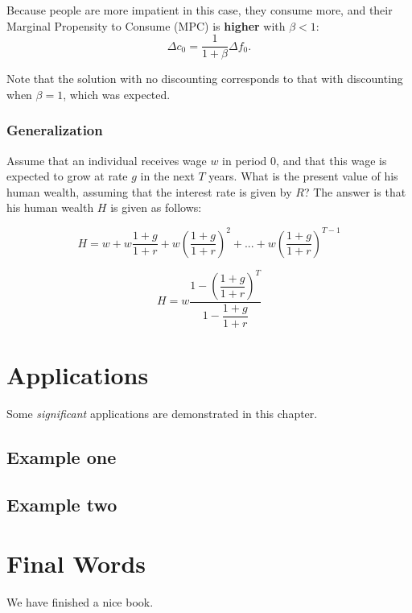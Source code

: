 \documentclass[]{book}
\theoremstyle{definition}
\theoremstyle{definition}
\theoremstyle{definition}
\theoremstyle{remark}
\begin{document}
Because people are more impatient in this case, they consume more, and
their Marginal Propensity to Consume (MPC) is \textbf{higher} with
\(\beta<1\): \[\Delta c_0 = \frac{1}{1+\beta}\Delta f_0.\]

Note that the solution with no discounting corresponds to that with
discounting when \(\beta=1\), which was expected.

\subsection{Generalization}\label{generalization}

Assume that an individual receives wage \(w\) in period \(0\), and that
this wage is expected to grow at rate \(g\) in the next \(T\) years.
What is the present value of his human wealth, assuming that the
interest rate is given by \(R\)? The answer is that his human wealth
\(H\) is given as follows:

\[H =w+w\frac{1+g}{1+r}+w\left(\frac{1+g}{1+r}\right)^{2}+...+w\left(\frac{1+g}{1+r}\right)^{T-1}\]

\[H =w\frac{1-\left(\dfrac{1+g}{1+r}\right)^{T}}{1-\dfrac{1+g}{1+r}}\]

\chapter{Applications}\label{applications}

Some \emph{significant} applications are demonstrated in this chapter.

\section{Example one}\label{example-one}

\section{Example two}\label{example-two}

\chapter{Final Words}\label{final-words}

We have finished a nice book.


\end{document}
